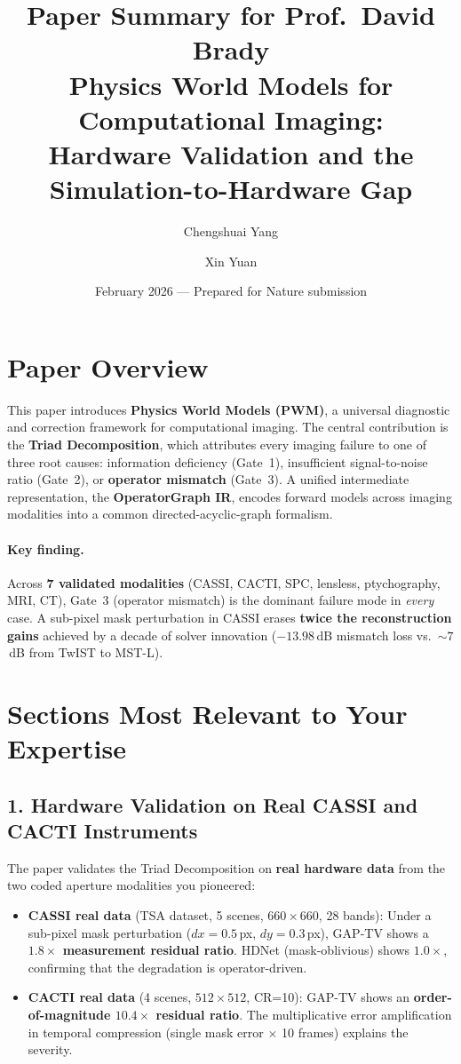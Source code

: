 \documentclass[11pt]{article}
\title{\textbf{Paper Summary for Prof.\ David Brady}\\[4pt]
\large Physics World Models for Computational Imaging:\\
Hardware Validation and the Simulation-to-Hardware Gap}
\author{Chengshuai Yang \and Xin Yuan}
\date{February 2026 --- Prepared for Nature submission}
\begin{document}
\maketitle
\thispagestyle{empty}

\section*{Paper Overview}

This paper introduces \textbf{Physics World Models (PWM)}, a universal diagnostic and correction framework for computational imaging.  The central contribution is the \textbf{Triad Decomposition}, which attributes every imaging failure to one of three root causes: information deficiency (Gate~1), insufficient signal-to-noise ratio (Gate~2), or \textbf{operator mismatch} (Gate~3).  A unified intermediate representation, the \textbf{OperatorGraph IR}, encodes forward models across imaging modalities into a common directed-acyclic-graph formalism.

\paragraph{Key finding.}  Across \textbf{7 validated modalities} (CASSI, CACTI, SPC, lensless, ptychography, MRI, CT), Gate~3 (operator mismatch) is the dominant failure mode in \emph{every} case.  A sub-pixel mask perturbation in CASSI erases \textbf{twice the reconstruction gains} achieved by a decade of solver innovation ($-13.98$\,dB mismatch loss vs.\ ${\sim}7$\,dB from TwIST to MST-L).

\section*{Sections Most Relevant to Your Expertise}

\subsection*{1. Hardware Validation on Real CASSI and CACTI Instruments}

The paper validates the Triad Decomposition on \textbf{real hardware data} from the two coded aperture modalities you pioneered:

\begin{itemize}
  \item \textbf{CASSI real data} (TSA dataset, 5 scenes, $660 \times 660$, 28 bands): Under a sub-pixel mask perturbation ($dx{=}0.5$\,px, $dy{=}0.3$\,px), GAP-TV shows a \textbf{$1.8\times$ measurement residual ratio}.  HDNet (mask-oblivious) shows $1.0\times$, confirming that the degradation is operator-driven.
  \item \textbf{CACTI real data} (4 scenes, $512 \times 512$, CR=10): GAP-TV shows an \textbf{order-of-magnitude $10.4\times$ residual ratio}.  The multiplicative error amplification in temporal compression (single mask error $\times$ 10 frames) explains the severity.
\end{itemize}
\end{document}
